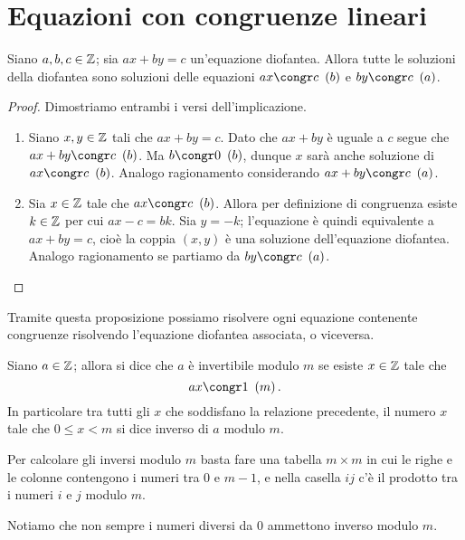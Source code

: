 \section{Equazioni con congruenze lineari}

\begin{proposition}
    Siano $a, b, c \in \mathbb{Z}$; sia $ax + by = c$ un'equazione diofantea. Allora tutte le soluzioni della diofantea sono soluzioni delle equazioni $ax \congr c \Mod{b}$ e $by \congr c \Mod{a}$.
\end{proposition}
\begin{proof}
    Dimostriamo entrambi i versi dell'implicazione.
    \begin{enumerate}
        \item Siano $x, y \in \mathbb{Z}$ tali che $ax + by = c$. Dato che $ax + by$ è uguale a $c$ segue che $ax + by \congr c \Mod{b}$. Ma $b \congr 0 \Mod{b}$, dunque $x$ sarà anche soluzione di $ax \congr c \Mod{b}$. Analogo ragionamento considerando $ax + by \congr c \Mod{a}$.
        \item Sia $x \in \mathbb{Z}$ tale che $ax \congr c \Mod{b}$. Allora per definizione di congruenza esiste $k \in \mathbb{Z}$ per cui $ax - c = bk$. Sia $y = -k$; l'equazione è quindi equivalente a $ax + by = c$, cioè la coppia $(x, y)$ è una soluzione dell'equazione diofantea. Analogo ragionamento se partiamo da $by \congr c \Mod{a}$. \qedhere
    \end{enumerate}
\end{proof}

Tramite questa proposizione possiamo risolvere ogni equazione contenente congruenze risolvendo l'equazione diofantea associata, o viceversa.

\begin{definition}
    Siano $a \in \mathbb{Z}$; allora si dice che $a$ è invertibile modulo $m$ se esiste  $x \in \mathbb{Z}$ tale che \[
        ax \congr 1 \Mod{m}
    .\]
    In particolare tra tutti gli $x$ che soddisfano la relazione precedente, il numero $x$ tale che $0 \leq x < m$ si dice inverso di $a$ modulo $m$.
\end{definition}
Per calcolare gli inversi modulo $m$ basta fare una tabella $m \times m$ in cui le righe e le colonne contengono i numeri tra $0$ e $m-1$, e nella casella $ij$ c'è il prodotto tra i numeri $i$ e $j$ modulo $m$.

Notiamo che non sempre i numeri diversi da $0$ ammettono inverso modulo $m$.

